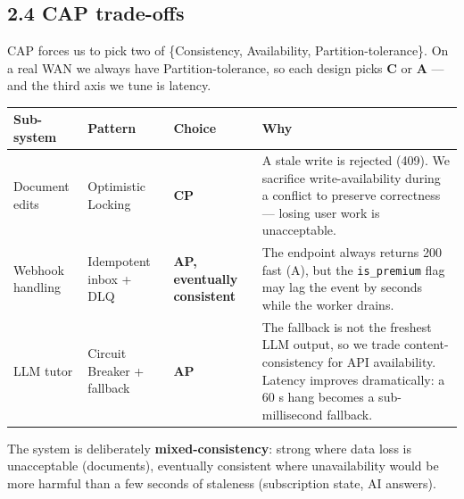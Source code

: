 \documentclass[11pt]{article}
\begin{document}
\subsection*{2.4 CAP trade-offs}
CAP forces us to pick two of \{Consistency, Availability, Partition-tolerance\}. On a real WAN we always have
Partition-tolerance, so each design picks \textbf{C} or \textbf{A} --- and the third axis we tune is latency.

\begin{center}
\footnotesize
\begin{tabular}{@{}lll p{8.0cm}@{}}
\toprule
\textbf{Sub-system} & \textbf{Pattern} & \textbf{Choice} & \textbf{Why} \\
\midrule
Document edits      & Optimistic Locking      & \textbf{CP}                    & A stale write is rejected (409). We sacrifice write-availability during a conflict to preserve correctness --- losing user work is unacceptable. \\
\addlinespace
Webhook handling    & Idempotent inbox + DLQ  & \textbf{AP, eventually consistent} & The endpoint always returns 200 fast (A), but the \texttt{is\_premium} flag may lag the event by seconds while the worker drains. \\
\addlinespace
LLM tutor           & Circuit Breaker + fallback & \textbf{AP}                 & The fallback is not the freshest LLM output, so we trade content-consistency for API availability. Latency improves dramatically: a 60 s hang becomes a sub-millisecond fallback. \\
\bottomrule
\end{tabular}
\end{center}

The system is deliberately \textbf{mixed-consistency}: strong where data loss is unacceptable (documents), eventually
consistent where unavailability would be more harmful than a few seconds of staleness (subscription state, AI answers).
\end{document}
